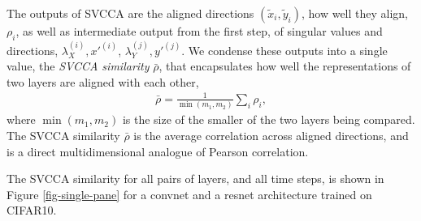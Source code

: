 \documentclass{article} %
\begin{document}
The outputs of SVCCA are the aligned directions $(\tilde{x}_i, \tilde{y}_i)$, how well they align, $\rho_i$, as well as intermediate output from the first step, of singular values and directions, $\lambda_X^{(i)}, {x'}^{(i)}$, $\lambda_Y^{(j)}, {y'}^{(j)}$. 
We condense these outputs into a single value, the {\em SVCCA similarity} $\bar{\rho}$, that encapsulates how well the representations of two layers are aligned with each other,
\begin{align}
\bar{\rho} = \frac{1}{\min\left(m_1, m_2\right)}\sum_i \rho_i
,
\end{align}
where $\min\left(m_1, m_2\right)$ is the size of the smaller of the two layers being compared. 
The SVCCA similarity $\bar{\rho}$ is the average correlation across aligned directions, and is a direct multidimensional analogue of Pearson correlation.

The SVCCA similarity for all pairs of layers, and all time steps, is shown in Figure \ref{fig-single-pane} for a convnet and a resnet architecture trained on CIFAR10.



\end{document}
